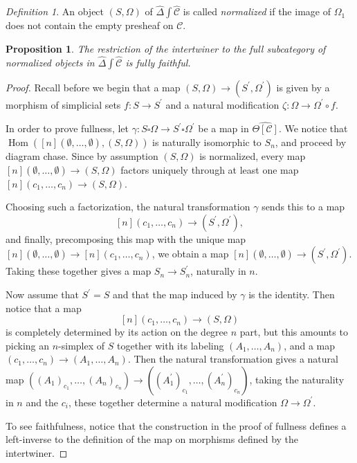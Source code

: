 \documentclass{amsart}
\numberwithin{equation}{section}
\theoremstyle{plain}   %
\newtheorem{prop}[subsection]{Proposition}
\theoremstyle{remark}
\newtheorem{defn}[subsection]{Definition}
\theoremstyle{plain}
\DeclareMathOperator{\Hom}{Hom}
\newcommand{\psh}[1]{\ensuremath{\widehat{#1}}}
\newcommand{\C}{\ensuremath{\mathcal{C}}}
\newcommand{\cellset}{\ensuremath{\widehat{\Theta[\mathcal{C}]}}}
\begin{document}
\begin{defn} An object \((S,\Omega)\) of \(\psh{\Delta}\int\psh{\C}\) is called \emph{normalized} if the image of \(\Omega_1\) does not contain the empty presheaf on \(\C\).
\end{defn}

\begin{prop} The restriction of the intertwiner to the full subcategory of normalized objects in \(\psh{\Delta}\int\psh{\C}\) is fully faithful.
\end{prop}
\begin{proof}
	Recall before we begin that a map \((S,\Omega)\to (S^\prime,\Omega^\prime)\) is given by a morphism of simplicial sets \(f:S\to S^\prime\) and a natural modification \(\zeta:\Omega\to \Omega^\prime\circ f\).

	In order to prove fullness, let \(\gamma:S\square\Omega\to S^\prime\square\Omega^\prime\) be a map in \(\cellset\). We notice that \(\Hom([n](\emptyset,\dots,\emptyset), (S,\Omega))\) is naturally isomorphic to \(S_n\), and proceed by diagram chase. Since by assumption \((S,\Omega)\) is normalized, every map \([n](\emptyset,\dots,\emptyset)\to (S,\Omega)\) factors uniquely through at least one map \([n](c_1,\dots,c_n)\to (S,\Omega)\).

	Choosing such a factorization, the natural transformation \(\gamma\) sends this to a map \[[n](c_1,\dots,c_n)\to (S^\prime,\Omega^\prime),\] and finally, precomposing this map with the unique map \([n](\emptyset,\dots,\emptyset)\to [n](c_1,\dots,c_n)\), we obtain a map \([n](\emptyset,\dots,\emptyset)\to (S^\prime,\Omega^\prime)\). Taking these together gives a map \(S_n\to S^\prime_n\), naturally in \(n\).

	Now assume that \(S^\prime=S\) and that the map induced by \(\gamma\) is the identity.  Then notice that a map \[[n](c_1,\dots,c_n)\to (S,\Omega)\] is completely determined by its action on the degree \(n\) part, but this amounts to picking an \(n\)-simplex of \(S\) together with its labeling \((A_1,\dots,A_n)\), and a map \((c_1,\dots,c_n)\to (A_1,\dots,A_n)\).  Then the natural transformation gives a natural map \(((A_1)_{c_1},\dots,(A_n)_{c_n})\to ((A^\prime_1)_{c_1},\dots,(A^\prime_n)_{c_n})\), taking the naturality in \(n\) and the \(c_i\), these together determine a natural modification \(\Omega\to \Omega^\prime\).

	To see faithfulness, notice that the construction in the proof of fullness defines a left-inverse to the definition of the map on morphisms defined by the intertwiner.
\end{proof}
\end{document}
